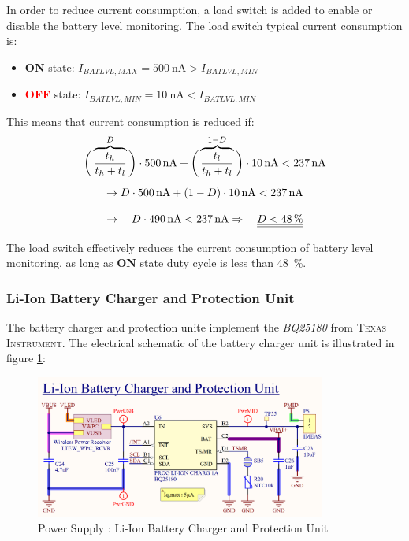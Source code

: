 \documentclass[report.tex]{subfiles}
\begin{document}
In order to reduce current consumption, a load switch is added to enable or disable the battery level monitoring. The load switch typical current consumption is:
\begin{itemize}
\item \textbf{\textcolor{mygreen}{ON}} state: $I_{BATLVL,MAX} =  \SI{500}{\nano\ampere} > I_{BATLVL,MIN}$
\item \textbf{\textcolor{red}{OFF}} state: $I_{BATLVL,MIN} = \SI{10}{\nano\ampere} < I_{BATLVL,MIN}$
\end{itemize} 
This means that current consumption is reduced if:
$$
\begin{array}{c}
\bigg(\overbrace{\dfrac{t_h}{t_h+t_l}}^{D}\bigg) \cdot \SI{500}{\nano\ampere} + \bigg(\overbrace{\dfrac{t_l}{t_h+t_l}}^{1-D}\bigg) \cdot \SI{10}{\nano\ampere} < \SI{237}{\nano\ampere}\\[15pt]
	\rightarrow D \cdot \SI{500}{\nano\ampere} + (1-D)\cdot \SI{10}{\nano\ampere} < \SI{237}{\nano\ampere}\\[12pt]
\rightarrow \quad D \cdot \SI{490}{\nano\ampere} < \SI{237}{\nano\ampere} \Rightarrow \quad \underline{\underline{D < \SI{48}{\percent}}}
\end{array}
$$

The load switch effectively reduces the current consumption of battery level monitoring, as long as \textbf{\textcolor{mygreen}{ON}} state duty cycle is less than \SI{48}{\percent}.

\subsubsection{Li-Ion Battery Charger and Protection Unit}

The battery charger and protection unite implement the \textit{BQ25180} from \textsc{Texas Instrument}. The electrical schematic of the battery charger unit is illustrated in figure \ref{fig:LTEWatch_Power_Supply_Li_Ion_Batt}:
\begin{figure}[H]
	\centering
	\includegraphics[width=0.85\textwidth]{Include/Figure/Hardware/LTEWatch_Power_Supply_Li-Ion_Batt}
	\caption{Power Supply : Li-Ion Battery Charger and Protection Unit}
	\label{fig:LTEWatch_Power_Supply_Li_Ion_Batt}
\end{figure}
\end{document}
